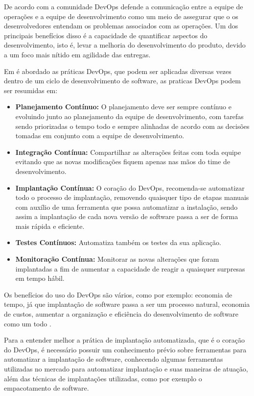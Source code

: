 De acordo com \cite{httermann2012DevOps} a comunidade DevOps defende a comunicação
entre a equipe de operações e a equipe de desenvolvimento como um meio de assegurar
que o os desenvolvedores entendam os problemas associados com as operações. Um dos
principais benefícios disso é a capacidade de quantificar aspectos do desenvolvimento,
isto é, levar a melhoria do desenvolvimento do produto, devido a um foco mais nítido
em agilidade das entregas.

Em \cite{7173368} é abordado as práticas DevOps, que podem ser aplicadas diversas
 vezes dentro de um ciclo de desenvolvimento de software, as praticas DevOps podem ser resumidas em:

 \begin{itemize}
   \item \textbf{Planejamento Contínuo:} O planejamento deve ser sempre contínuo
   e evoluindo junto ao planejamento da equipe de desenvolvimento, com tarefas
   sendo priorizadas o tempo todo e sempre alinhadas de acordo com as decisões tomadas
   em conjunto com a equipe de desenvolvimento.
   \item \textbf{Integração Contínua:} Compartilhar as alterações feitas com toda equipe
   evitando que as novas modificações fiquem apenas nas mãos do time de desenvolvimento.
   \item \textbf{Implantação Contínua:} O coração do DevOps, recomenda-se automatizar
   todo o processo de implantação, removendo quaisquer tipo de etapas manuais com auxílio
   de uma ferramenta que possa automatizar a instalação, sendo assim a implantação
   de cada nova versão de software passa a ser de forma mais rápida e eficiente.
   \item \textbf{Testes Contínuos:} Automatiza também os testes da sua aplicação.
   \item \textbf{Monitoração Contínua:} Monitorar as novas alterações
   que foram implantadas a fim de aumentar a capacidade de reagir a quaisquer surpresas
   em tempo hábil.
 \end{itemize}

 Os benefícios do uso do DevOps são vários, como por exemplo: economia de tempo,
 já que implantação de software passa a ser um processo natural, economia de custos, aumentar
 a organização e eficiência do desenvolvimento de software como um todo \cite{7173368}.

Para a entender melhor a prática de implantação automatizada, que é o coração
do DevOps, é necessário possuir um conhecimento prévio sobre ferramentas para
automatizar a implantação de software, conhecendo algumas ferramentas utilizadas
no mercado para automatizar implantação e suas maneiras de atuação, além das técnicas
de implantações utilizadas, como por exemplo o empacotamento de software.

